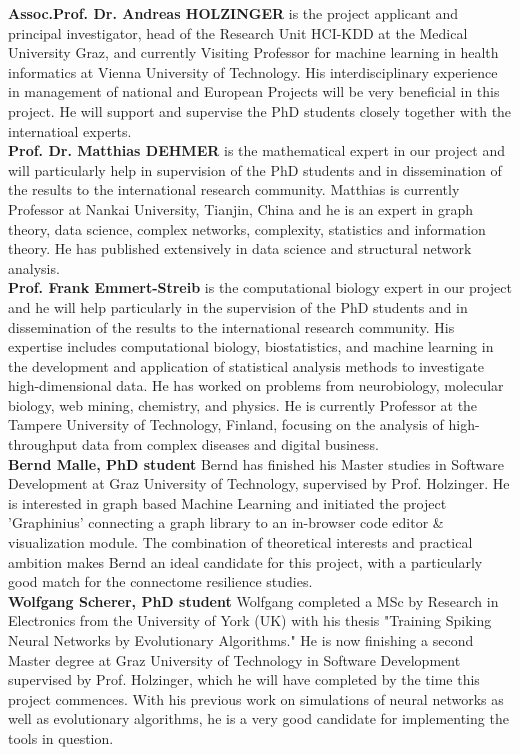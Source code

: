 \documentclass[a4paper,11pt]{article}
\begin{document}
\textbf{Assoc.Prof. Dr. Andreas HOLZINGER} is the project applicant and principal investigator, head of the Research Unit HCI-KDD at the Medical University Graz, and currently Visiting Professor for machine learning in health informatics at Vienna University of Technology. His interdisciplinary experience in management of national and European Projects will be very beneficial in this project. He will support and supervise the PhD students closely together with the internatioal experts.
\\[0,2cm]
\textbf{Prof. Dr. Matthias DEHMER} is the mathematical expert in our project and will particularly help in supervision of the PhD students and in dissemination of the results to the international research community. Matthias is currently Professor at Nankai University, Tianjin, China and he is an expert in graph theory, data science,
complex networks, complexity, statistics and information theory. He has published extensively in data science and structural network analysis.   
\\[0,2cm]
\textbf{Prof. Frank Emmert-Streib} is the computational biology expert in our project and he will help particularly in the supervision of the PhD students and in dissemination of the results to the international research community. His expertise includes computational biology, biostatistics, and machine learning in the development and application of statistical analysis methods to investigate high-dimensional data. He has worked on problems from neurobiology, molecular biology, web mining, chemistry, and physics. He is currently Professor at the Tampere University of Technology, Finland, focusing on the analysis of high-throughput data from complex diseases and digital business.  
\\[0,2cm]
\textbf{Bernd Malle, PhD student}
Bernd has finished his Master studies in Software Development at Graz University of Technology, supervised by Prof. Holzinger. He is interested in graph based Machine Learning and initiated the project 'Graphinius' connecting a graph library to an in-browser code editor \& visualization module. The combination of theoretical interests and practical ambition makes Bernd an ideal candidate for this project, with a particularly good match for the connectome resilience studies.
\\[0,2cm]
\textbf{Wolfgang Scherer, PhD student}
Wolfgang completed a MSc by Research in Electronics from the University of York (UK) with his thesis "Training Spiking Neural Networks by Evolutionary Algorithms." He is now finishing a second Master degree at Graz University of Technology in Software Development supervised by Prof. Holzinger, which he will have completed by the time this project commences. With his previous work on simulations of neural networks as well as evolutionary algorithms, he is a very good candidate for implementing the tools in question.
\end{document}
